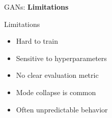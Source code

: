 \begin{frame}{}
    \LARGE GANs: \textbf{Limitations}
\end{frame}

\begin{frame}{Limitations}
    \begin{itemize}
        \item Hard to train
        \item Sensitive to hyperparameters
        \item No clear evaluation metric
        \item Mode collapse is common
        \item Often unpredictable behavior
    \end{itemize}
\end{frame}